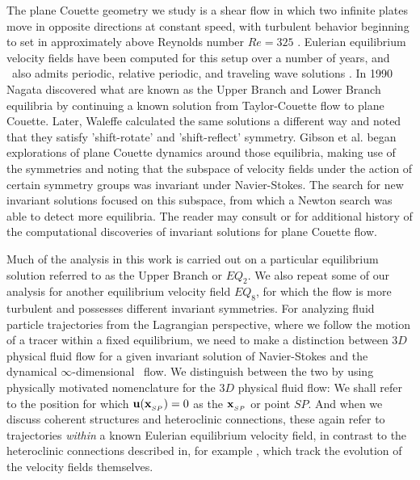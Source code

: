 \documentclass[letter,12pt,openany]{article}
\begin{document}
The plane Couette geometry we study is a shear flow in which two infinite plates move in opposite directions at constant speed, with turbulent behavior beginning to set in approximately above Reynolds number $Re=325$ \cite{GHCV08}. 
Eulerian equilibrium velocity fields have been computed for this setup over a number of years, and \pCf\ also admits periodic, relative periodic, and traveling wave solutions \cite{GHCV08,DV04}.  In 1990 Nagata \cite{N90} discovered what are known as the Upper Branch and Lower Branch equilibria by continuing a known solution from Taylor-Couette flow to plane
Couette. Later, Waleffe \cite{W03}
calculated the same solutions a different way and noted that they
satisfy 'shift-rotate' and 'shift-reflect' symmetry. Gibson et al. \cite{GHCW07} began explorations of plane Couette dynamics around
those equilibria, making use of the symmetries and noting that the subspace of velocity fields under the action of certain symmetry groups was invariant under Navier-Stokes.
The search for new invariant solutions focused on this subspace, from which a Newton search was able to detect more equilibria. The reader may consult \cite{GHCV08} or \cite{GHCW07} for additional history of the computational discoveries of invariant solutions for plane Couette flow.

Much of the analysis in this work is carried out on a particular equilibrium solution referred to as the Upper Branch or $EQ_2$.
    We also repeat some of our analysis  for another equilibrium velocity field $EQ_8$, for which the flow is more turbulent
    and possesses different invariant symmetries.
For analyzing fluid particle trajectories from the Lagrangian perspective, where we follow the motion of a tracer within a fixed equilibrium,  we need to make a distinction between
$3D$ physical fluid flow for a given invariant solution of Navier-Stokes
and the dynamical $\infty$-dimensional \statesp\ flow. We distinguish between the two by using physically motivated nomenclature
for the $3D$ physical fluid flow: We shall refer to the position
 for which
${\bf u}({\bf x}_{_{SP}})=0$
as the {\em \stagp} ${\bf x}_{_{SP}}$ or point $SP$. And when we discuss 
coherent structures and heteroclinic connections, these again refer to 
trajectories \textit{within} a known Eulerian equilibrium velocity field, 
in contrast to the heteroclinic connections described in, for example 
\cite{GHCV08}, which track the evolution of the velocity fields 
themselves. 
\end{document}
